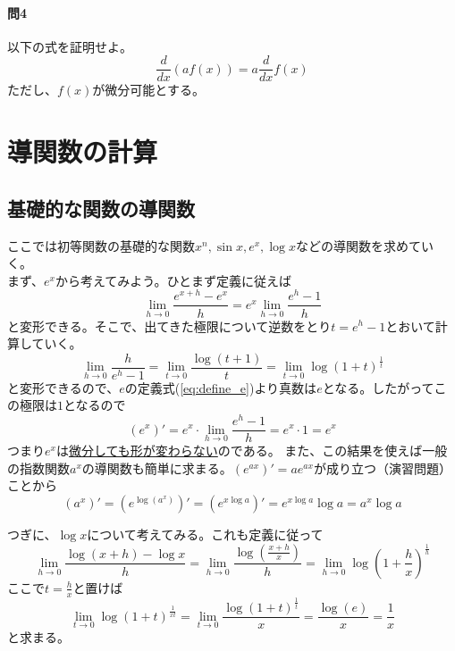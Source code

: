 \documentclass[a4j,dvipdfmx]{jsarticle}
\begin{document}
            \paragraph{問4}以下の式を証明せよ。
            \begin{equation*}
                \frac{d}{dx}(af(x))=a\frac{d}{dx}f(x)
            \end{equation*}
            ただし、$f(x)$が微分可能とする。
        \clearpage
        \section{導関数の計算}
            \subsection{基礎的な関数の導関数}
                \noindent
                ここでは初等関数の基礎的な関数$x^n,\sin x,e^x,\log x$などの導関数を求めていく。\\

                まず、$e^x$から考えてみよう。ひとまず定義に従えば
                \begin{equation}
                    \lim_{h\to 0}\frac{e^{x+h}-e^{x}}{h}=e^x\lim_{h\to 0}\frac{e^h-1}{h}
                \end{equation}
                と変形できる。そこで、出てきた極限について逆数をとり$t=e^h-1$とおいて計算していく。
                \begin{equation}
                    \lim_{h\to 0}\frac{h}{e^h-1}=\lim_{t\to 0}\frac{\log(t+1)}{t}=\lim_{t\to 0}\log(1+t)^\frac{1}{t}
                \end{equation}
                と変形できるので、$e$の定義式(\ref{eq:define_e})より真数は$e$となる。したがってこの極限は$1$となるので
                \begin{equation}
                    (e^x)'=e^x \cdot \lim_{h\to 0}\frac{e^h-1}{h}=e^x \cdot 1 =e^x
                \end{equation}
                つまり$e^x$は\underline{微分しても形が変わらない}のである。
                また、この結果を使えば一般の指数関数$a^x$の導関数も簡単に求まる。$(e^{ax})'=ae^{ax}$が成り立つ（演習問題）ことから
                \begin{equation}
                    (a^x)'=(e^{\log(a^x)})'=(e^{x\log a})'=e^{x\log a}\log a=a^x\log a
                \end{equation}

                つぎに、$\log x$について考えてみる。これも定義に従って
                \begin{equation}
                    \lim_{h\to 0}\frac{\log(x+h)-\log x}{h}=\lim_{h\to 0}\frac{\log\left(\frac{x+h}{x}\right)}{h}=\lim_{h\to 0}\log\left(1+\frac{h}{x}\right)^\frac{1}{h}
                \end{equation}
                ここで$t=\frac{h}{x}$と置けば
                \begin{equation}
                    \lim_{t \to 0}\log(1+t)^\frac{1}{xt}=\lim_{t\to 0}\frac{\log(1+t)^\frac{1}{t}}{x}=\frac{\log(e)}{x}=\frac{1}{x}
                \end{equation}
                と求まる。
\end{document}
